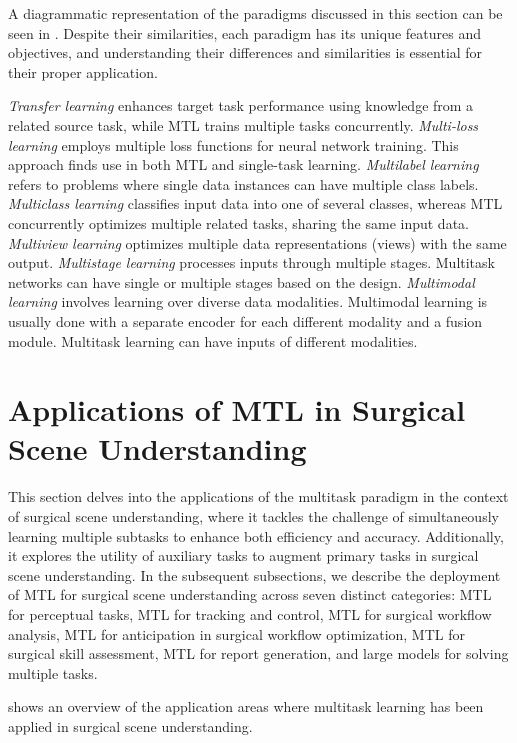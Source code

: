 A diagrammatic representation of the paradigms discussed in this section can be seen in .
Despite their similarities, each paradigm has its unique features and objectives, and understanding their differences and similarities is essential for their proper application.

\emph{Transfer learning} enhances target task performance using knowledge from a related source task, while MTL trains multiple tasks concurrently.
\emph{Multi-loss learning} employs multiple loss functions for neural network training. This approach finds use in both MTL and single-task learning.
\emph{Multilabel learning} refers to problems where single data instances can have multiple class labels.
\emph{Multiclass learning} classifies input data into one of several classes, whereas MTL concurrently optimizes multiple related tasks, sharing the same input data.
\emph{Multiview learning} optimizes multiple data representations (views) with the same output.
\emph{Multistage learning} processes inputs through multiple stages. Multitask networks can have single or multiple stages based on the design.
\emph{Multimodal learning} involves learning over diverse data modalities. Multimodal learning is usually done with a separate encoder for each different modality and a fusion module. Multitask learning can have inputs of different modalities.


\section{Applications of MTL in Surgical Scene Understanding} \label{sec::mtl_surgical}

This section delves into the applications of the multitask paradigm in the context of surgical scene understanding, where it tackles the challenge of simultaneously learning multiple subtasks to enhance both efficiency and accuracy.
Additionally, it explores the utility of auxiliary tasks to augment primary tasks in surgical scene understanding. 
In the subsequent subsections, we describe the deployment of MTL for surgical scene understanding across seven distinct categories: MTL for perceptual tasks, MTL for tracking and control, MTL for surgical workflow analysis, MTL for anticipation in surgical workflow optimization, MTL for surgical skill assessment, MTL for report generation, and large models for solving multiple tasks. 

 shows an overview of the application areas where multitask learning has been applied in surgical scene understanding.

